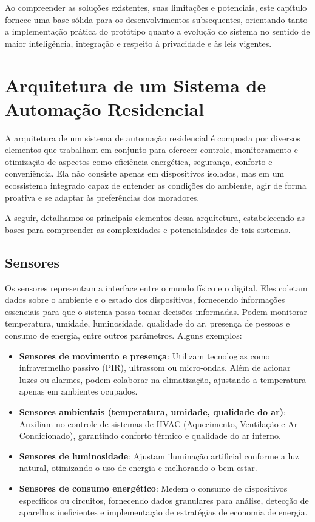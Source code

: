 Ao compreender as soluções existentes, suas limitações e potenciais, este capítulo fornece uma base sólida para os desenvolvimentos subsequentes, orientando tanto a implementação prática do protótipo quanto a evolução do sistema no sentido de maior inteligência, integração e respeito à privacidade e às leis vigentes.

\section{Arquitetura de um Sistema de Automação Residencial}

A arquitetura de um sistema de automação residencial é composta por diversos elementos que trabalham em conjunto para oferecer controle, monitoramento e otimização de aspectos como eficiência energética, segurança, conforto e conveniência. Ela não consiste apenas em dispositivos isolados, mas em um ecossistema integrado capaz de entender as condições do ambiente, agir de forma proativa e se adaptar às preferências dos moradores.

A seguir, detalhamos os principais elementos dessa arquitetura, estabelecendo as bases para compreender as complexidades e potencialidades de tais sistemas.

\subsection{Sensores}

Os sensores representam a interface entre o mundo físico e o digital. Eles coletam dados sobre o ambiente e o estado dos dispositivos, fornecendo informações essenciais para que o sistema possa tomar decisões informadas. Podem monitorar temperatura, umidade, luminosidade, qualidade do ar, presença de pessoas e consumo de energia, entre outros parâmetros. Alguns exemplos:

\begin{itemize}
    \item \textbf{Sensores de movimento e presença}: Utilizam tecnologias como infravermelho passivo (PIR), ultrassom ou micro-ondas. Além de acionar luzes ou alarmes, podem colaborar na climatização, ajustando a temperatura apenas em ambientes ocupados.
    \item \textbf{Sensores ambientais (temperatura, umidade, qualidade do ar)}: Auxiliam no controle de sistemas de HVAC (Aquecimento, Ventilação e Ar Condicionado), garantindo conforto térmico e qualidade do ar interno.
    \item \textbf{Sensores de luminosidade}: Ajustam iluminação artificial conforme a luz natural, otimizando o uso de energia e melhorando o bem-estar.
    \item \textbf{Sensores de consumo energético}: Medem o consumo de dispositivos específicos ou circuitos, fornecendo dados granulares para análise, detecção de aparelhos ineficientes e implementação de estratégias de economia de energia.
\end{itemize}

